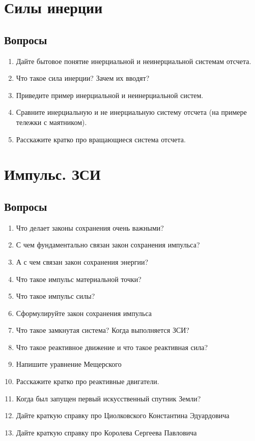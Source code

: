 \documentclass[12pt,a4paper]{report}
\begin{document}
\chapter{Силы инерции}
\section{Вопросы}
\begin{enumerate}
\item Дайте бытовое понятие инерциальной и неинерциальной системам отсчета.
\item Что такое сила инерции? Зачем их вводят?
\item Приведите пример инерциальной и неинерциальной систем.
\item Сравните инерциальную и не инерциальную систему отсчета (на примере тележки с маятником).
\item Расскажите кратко про вращающиеся система отсчета.

\end{enumerate}

\chapter{Импульс. ЗСИ}
\section{Вопросы}
\begin{enumerate}
\item Что делает законы сохранения очень важными?
\item С чем фундаментально связан закон сохранения импульса?
\item А с чем связан закон сохранения энергии?
\item Что такое импульс материальной точки?
\item Что такое импульс силы?
\item Сформулируйте закон сохранения импульса
\item Что такое замкнутая система? Когда выполняется ЗСИ?
\item Что такое реактивное движение и что такое реактивная сила?
\item Напишите уравнение Мещерского
\item Расскажите кратко про реактивные двигатели.
\item Когда был запущен первый искусственный спутник Земли?
\item Дайте краткую справку про Циолковского Константина Эдуардовича
\item Дайте краткую справку про Королева Сергеева Павловича
\end{enumerate}
\end{document}
